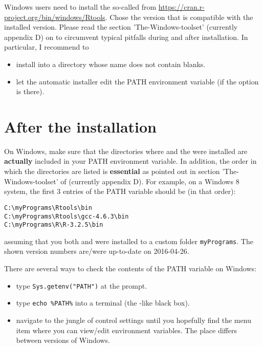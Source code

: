 \documentclass[10pt,a4paper]{article}
\begin{document}
Windows users need to install the so-called  from \url{https://cran.r-project.org/bin/windows/Rtools}. Chose the version that is compatible with the installed  version. Please read the section 'The-Windows-toolset' (currently appendix D) on \radmin{} to circumvent typical pitfalls during and after installation. In particular, I recommend to
\begin{itemize}
  \item install into a directory whose name does not contain blanks.
  \item let the automatic installer edit the PATH environment variable (if the option is there). 
\end{itemize}

\section{After the installation} \label{sec:postInstall}

On Windows, make sure that the directories where  and the   were installed are \textbf{actually} included in your PATH environment variable. In addition, the order in which the directories are listed is \textbf{essential} as pointed out in section 'The-Windows-toolset' of \radmin{} (currently appendix D). For example, on a Windows 8 system, the first 3 entries of the PATH variable should be (in that order):

\begin{verbatim}
C:\myPrograms\Rtools\bin
C:\myPrograms\Rtools\gcc-4.6.3\bin
C:\myPrograms\R\R-3.2.5\bin
\end{verbatim}

\noindent assuming that you both  and  were installed to a custom folder \verb|myPrograms|. The shown version numbers are/were up-to-date on 2016-04-26.

There are several ways to check the contents of the PATH variable on Windows:

\begin{itemize}
  \item type \verb|Sys.getenv("PATH")| at the  prompt.
  \item type \verb|echo %PATH%| into a  terminal (the -like black box).
  \item navigate to the jungle of control settings until you hopefully find the menu item where you can view/edit environment variables. The place differs between versions of Windows.
\end{itemize}
\end{document}

